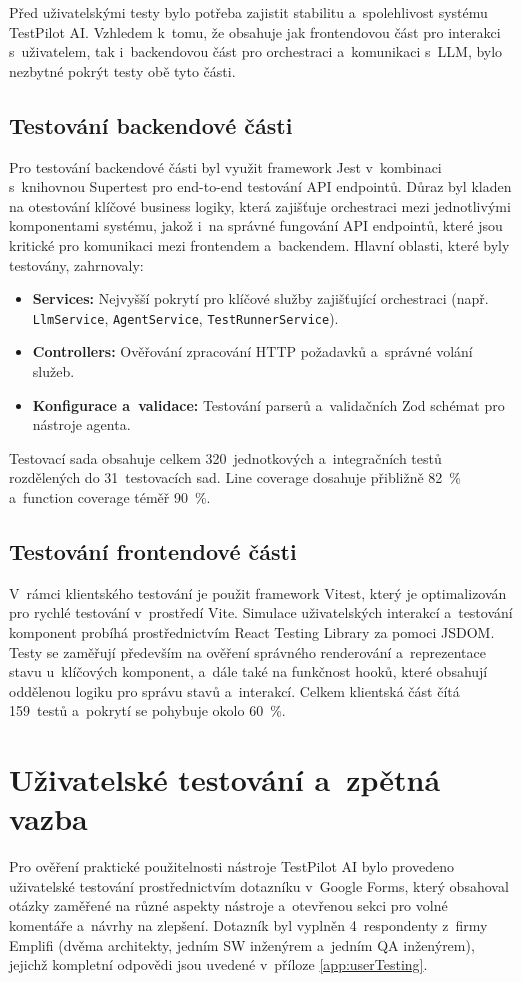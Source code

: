 \documentclass[czech, ing, kiv, he, iso690numb, viewonly]{fasthesis}
\begin{document}
Před uživatelskými testy bylo potřeba zajistit stabilitu a~spolehlivost systému TestPilot AI.
Vzhledem k~tomu, že obsahuje jak frontendovou část pro interakci s~uživatelem, tak i~backendovou část pro orchestraci 
a~komunikaci s~LLM, bylo nezbytné pokrýt testy obě tyto části.

\subsection*{Testování backendové části}
Pro testování backendové části byl využit framework Jest v~kombinaci s~knihovnou Supertest 
pro end-to-end testování API endpointů.
Důraz byl kladen na otestování klíčové business logiky, která zajišťuje orchestraci mezi jednotlivými komponentami systému,
jakož i~na správné fungování API endpointů, které jsou kritické pro komunikaci mezi frontendem a~backendem.
Hlavní oblasti, které byly testovány, zahrnovaly:

\begin{itemize}
    \item \textbf{Services:} Nejvyšší pokrytí pro klíčové služby 
    zajišťující orchestraci (např. \texttt{LlmService}, \texttt{AgentService}, \texttt{TestRunnerService}).
    \item \textbf{Controllers:} Ověřování zpracování HTTP požadavků a~správné volání služeb.
    \item \textbf{Konfigurace a~validace:} Testování parserů a~validačních Zod schémat pro nástroje agenta.
\end{itemize}

Testovací sada obsahuje celkem 320~jednotkových a~integračních testů rozdělených do 
31~testovacích sad. Line coverage dosahuje přibližně 82~\% a~function coverage téměř 90~\%.

\subsection*{Testování frontendové části}
V~rámci klientského testování je použit framework Vitest, který 
je optimalizován pro rychlé testování v~prostředí Vite.
Simulace uživatelských interakcí a~testování komponent probíhá prostřednictvím React Testing Library
za pomoci JSDOM.
Testy se zaměřují především na ověření správného renderování a~reprezentace stavu u~klíčových komponent, 
a~dále také na funkčnost hooků, které obsahují oddělenou logiku pro správu stavů a~interakcí.
Celkem klientská část čítá 159~testů a~pokrytí se pohybuje okolo 60~\%. 

\section{Uživatelské testování a~zpětná vazba}
Pro ověření praktické použitelnosti nástroje TestPilot AI bylo 
provedeno uživatelské testování prostřednictvím dotazníku 
v~Google Forms, který obsahoval otázky zaměřené na různé aspekty nástroje 
a~otevřenou sekci pro volné komentáře a~návrhy na zlepšení.
Dotazník byl vyplněn 4~respondenty z~firmy Emplifi (dvěma architekty, jedním SW inženýrem a~jedním QA inženýrem), 
jejichž kompletní odpovědi jsou uvedené v~příloze \ref{app:userTesting}.
\end{document}
